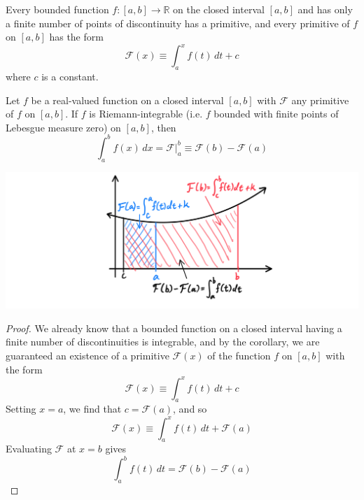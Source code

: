 \documentclass{article}
\begin{document}
      \begin{corollary}
      Every bounded function $f: [a, b] \longrightarrow \mathbb{R}$ on the closed interval $[a, b]$ and has only a finite number of points of discontinuity has a primitive, and every primitive of $f$ on $[a, b]$ has the form 
      \[\mathcal{F}(x) \equiv \int_a^x f(t)\,dt + c\]
      where $c$ is a constant. 
      \end{corollary}

      \begin{theorem}
      Let $f$ be a real-valued function on a closed interval $[a, b]$ with $\mathcal{F}$ any primitive of $f$ on $[a, b]$. If $f$ is Riemann-integrable (i.e. $f$ bounded with finite points of Lebesgue measure zero) on $[a, b]$, then 
      \[\int_a^b f(x)\,dx  = \mathcal{F} \big|_a^b \equiv \mathcal{F}(b) - \mathcal{F}(a)\]
      \begin{center}
          \includegraphics[scale=0.25]{img/Second_Fundamental_Theorem_Analysis.PNG}
      \end{center}
      \end{theorem}
      \begin{proof}
      We already know that a bounded function on a closed interval having a finite number of discontinuities is integrable, and by the corollary, we are guaranteed an existence of a primitive $\mathcal{F}(x)$ of the function $f$ on $[a, b]$ with the form 
      \[\mathcal{F} (x) \equiv \int_a^x f(t)\,dt + c\]
      Setting $x = a$, we find that $c = \mathcal{F}(a)$, and so 
      \[\mathcal{F}(x) \equiv \int_a^x f(t)\,dt + \mathcal{F}(a)\]
      Evaluating $\mathcal{F}$ at $x = b$ gives
      \[\int_a^b f(t)\,dt = \mathcal{F}(b) - \mathcal{F}(a)\]
      \end{proof}
\end{document}
